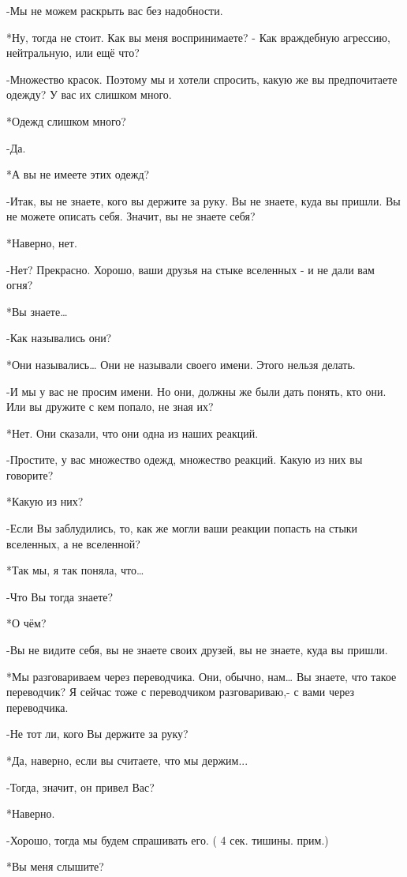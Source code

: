 -Мы не можем раскрыть вас без надобности.

*Ну, тогда не стоит. Как вы меня воспринимаете? - Как враждебную агрессию, нейтральную, или ещё что?

-Множество красок. Поэтому мы и хотели спросить, какую же вы предпочитаете одежду? У вас их слишком много.

*Одежд слишком много?

-Да.

*А вы не имеете этих одежд?

-Итак, вы не знаете, кого вы держите за руку. Вы не знаете, куда вы пришли. Вы не можете описать себя. Значит, вы не знаете себя?

*Наверно, нет.

-Нет? Прекрасно. Хорошо, ваши друзья на стыке вселенных - и не дали вам огня?

*Вы знаете…

-Как назывались они?

*Они назывались… Они не называли своего имени. Этого нельзя делать.

-И мы у вас не просим имени. Но они, должны же были дать понять, кто они. Или вы дружите с кем попало, не зная их?

*Нет. Они сказали, что они одна из наших реакций. 

-Простите, у вас множество одежд, множество реакций. Какую из них вы говорите?

*Какую из них?

-Если Вы заблудились, то, как же могли ваши реакции попасть на стыки вселенных, а не вселенной?

*Так мы, я так поняла, что…

-Что Вы тогда знаете?

*О чём?

-Вы не видите себя, вы не знаете своих друзей, вы не знаете, куда вы пришли.

*Мы разговариваем через переводчика. Они, обычно, нам… Вы знаете, что такое переводчик? Я сейчас тоже с переводчиком разговариваю,-  с вами через переводчика.

-Не тот ли, кого Вы держите за руку?

*Да, наверно, если вы считаете, что мы держим...

-Тогда, значит, он привел Вас?

*Наверно.

-Хорошо, тогда мы будем спрашивать его. ( 4 сек. тишины. прим.)

*Вы меня слышите?

